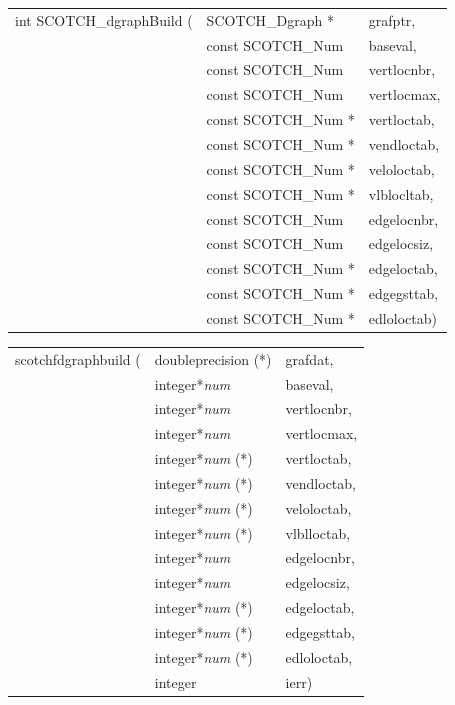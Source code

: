 \begin{itemize}
\progsyn

{\tt\begin{tabular}{l@{}ll}
int SCOTCH\_dgraphBuild ( & SCOTCH\_Dgraph *    & grafptr,    \\
                          & const SCOTCH\_Num   & baseval,    \\
                          & const SCOTCH\_Num   & vertlocnbr, \\
                          & const SCOTCH\_Num   & vertlocmax, \\
                          & const SCOTCH\_Num * & vertloctab, \\
                          & const SCOTCH\_Num * & vendloctab, \\
                          & const SCOTCH\_Num * & veloloctab, \\
                          & const SCOTCH\_Num * & vlblocltab, \\
                          & const SCOTCH\_Num   & edgelocnbr, \\
                          & const SCOTCH\_Num   & edgelocsiz, \\
                          & const SCOTCH\_Num * & edgeloctab, \\
                          & const SCOTCH\_Num * & edgegsttab, \\
                          & const SCOTCH\_Num * & edloloctab)
\end{tabular}}

{\tt\begin{tabular}{l@{}ll}
scotchfdgraphbuild ( & doubleprecision (*)   & grafdat,    \\
                     & integer*{\it num}     & baseval,    \\
                     & integer*{\it num}     & vertlocnbr, \\
                     & integer*{\it num}     & vertlocmax, \\
                     & integer*{\it num} (*) & vertloctab, \\
                     & integer*{\it num} (*) & vendloctab, \\
                     & integer*{\it num} (*) & veloloctab, \\
                     & integer*{\it num} (*) & vlblloctab, \\
                     & integer*{\it num}     & edgelocnbr, \\
                     & integer*{\it num}     & edgelocsiz, \\
                     & integer*{\it num} (*) & edgeloctab, \\
                     & integer*{\it num} (*) & edgegsttab, \\
                     & integer*{\it num} (*) & edloloctab, \\
                     & integer               & ierr)
\end{tabular}}


\end{itemize}
